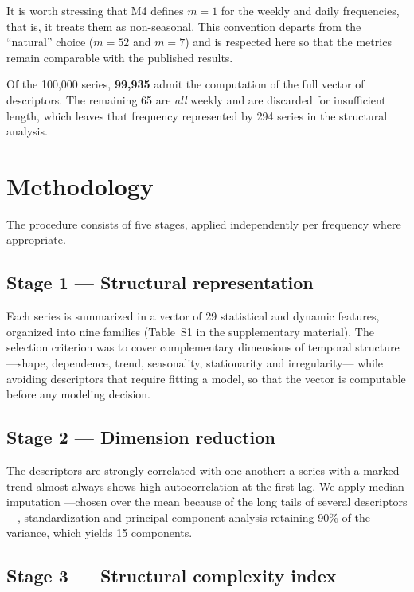 It is worth stressing that M4 defines $m=1$ for the weekly and daily frequencies, that is,
it treats them as non-seasonal. This convention departs from the ``natural'' choice
($m=52$ and $m=7$) and is respected here so that the metrics remain comparable with the
published results.

Of the 100{,}000 series, \textbf{99{,}935} admit the computation of the full vector of
descriptors. The remaining 65 are \emph{all} weekly and are discarded for insufficient
length, which leaves that frequency represented by 294 series in the structural analysis.


\section{Methodology}\label{sec:metodo}

The procedure consists of five stages, applied independently per frequency where
appropriate.

\subsection{Stage 1 --- Structural representation}

Each series is summarized in a vector of 29 statistical and dynamic features, organized
into nine families (Table~S1 in the supplementary material). The selection criterion was
to cover complementary dimensions of temporal structure ---shape, dependence, trend,
seasonality, stationarity and irregularity--- while avoiding descriptors that require
fitting a model, so that the vector is computable before any modeling decision.



\subsection{Stage 2 --- Dimension reduction}

The descriptors are strongly correlated with one another: a series with a marked trend
almost always shows high autocorrelation at the first lag. We apply median imputation
---chosen over the mean because of the long tails of several descriptors---,
standardization and principal component analysis retaining 90\% of the variance, which
yields 15 components.

\subsection{Stage 3 --- Structural complexity index}

